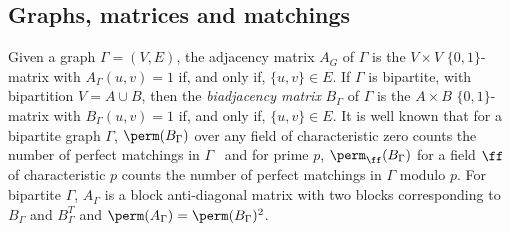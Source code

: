 \documentclass[11pt]{article}
\begin{document}
\subsection{Graphs, matrices and matchings}
Given a graph $\Gamma = (V,E)$, the adjacency matrix $A_G$ of $\Gamma$ is the $V \times V$ $\{0,1\}$-matrix with $A_\Gamma(u,v) = 1$ if, and only if, $\{u,v\} \in E$.  If $\Gamma$ is bipartite, with bipartition $V = A \cup B$, then the \emph{biadjacency matrix} $B_\Gamma$ of $\Gamma$ is the $A \times B$ $\{0,1\}$-matrix with $B_\Gamma(u,v) = 1$ if, and only if, $\{u,v\} \in E$.
It is well known that for a bipartite graph $\Gamma$, $\perm(B_\Gamma)$ over any field of characteristic zero counts the number of perfect matchings in $\Gamma$~\cite{Harary69} and for prime $p$, $\perm_{\ff}(B_\Gamma)$ for a field $\ff$ of characteristic $p$ counts the number of perfect matchings in $\Gamma$ modulo $p$. For bipartite $\Gamma$, 
$A_\Gamma$ is a block anti-diagonal matrix with two blocks corresponding to $B_\Gamma$ and $B_\Gamma^T$ and $\perm(A_\Gamma) = \perm(B_\Gamma)^2$.
\end{document}
